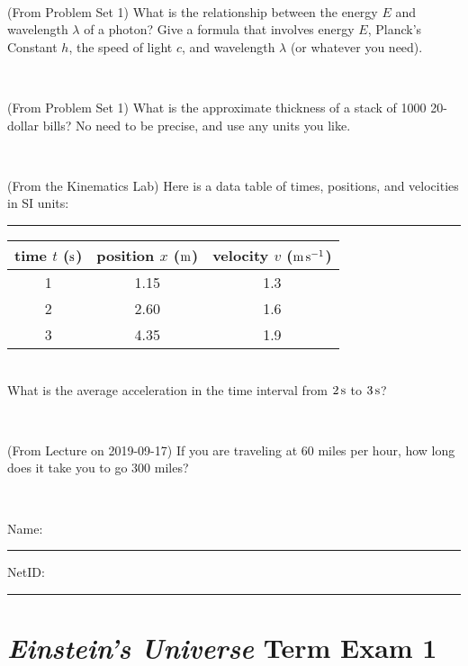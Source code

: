 \documentclass[12pt, letterpaper]{article}
\begin{document}
\vfill ~


\clearpage


\begin{problem} (From Problem Set 1)
What is the relationship between the energy $E$ and wavelength
$\lambda$ of a photon? Give a formula that involves energy $E$,
Planck's Constant $h$, the speed of light $c$, and wavelength
$\lambda$ (or whatever you need).
\end{problem}

\vfill ~

\begin{problem} (From Problem Set 1)
What is the approximate thickness of a stack of 1000 20-dollar bills?
No need to be precise, and use any units you like.
\end{problem}


\vfill ~

\begin{problem} (From the Kinematics Lab)
Here is a data table of times, positions, and velocities in SI units:\\
\rule{1.0in}{0pt}\begin{tabular}{c|c|c}
time $t$ ($\mathrm{s}$) & position $x$ ($\mathrm{m}$) & velocity $v$ ($\mathrm{m}\,\mathrm{s}^{-1}$) \\
\hline
1 & 1.15 & 1.3 \\
2 & 2.60 & 1.6 \\
3 & 4.35 & 1.9 \\
\hline
\end{tabular}\\
What is the average acceleration in the time interval from $2\,\mathrm{s}$ to $3\,\mathrm{s}$?
\end{problem}


\vfill ~

\begin{problem} (From Lecture on 2019-09-17)
If you are traveling at 60 miles per hour, how long does
it take you to go 300 miles?
\end{problem}


\vfill ~


\cleardoublepage



\noindent
Name: \rule[-1ex]{0.60\textwidth}{0.1pt}
NetID: \rule[-1ex]{0.20\textwidth}{0.1pt}

\section*{\textsl{Einstein's Universe} Term Exam 1}
\setcounter{problem}{1}
\end{document}
